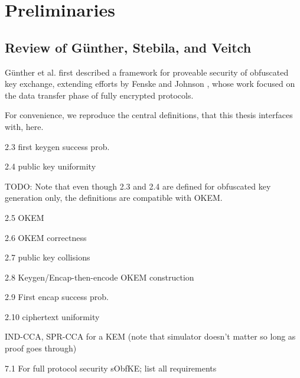 \chapter{Preliminaries}\label{ch:preliminaries}

\section{\texorpdfstring{Review of Günther, Stebila, and Veitch \cite{CCS:GunSteVei24}}{Review of Günther, Stebila, and Veitch}} \label{sec:review-gsv24}

Günther et al. first described a framework for proveable security of obfuscated key exchange, extending efforts by Fenske and Johnson \cite{CCS:FenJoh24}, whose work focused on the data transfer phase of fully encrypted protocols.

For convenience, we reproduce the central definitions, that this thesis interfaces with, here.

\begin{definition}\label{def:first-keygen-success}
    2.3 first keygen success prob.
\end{definition}

\begin{definition}\label{def:pk-uniformity}
    2.4 public key uniformity
\end{definition}

TODO: Note that even though 2.3 and 2.4 are defined for obfuscated key generation only, the definitions are compatible with OKEM.

\begin{definition}\label{def:okem}
    2.5 OKEM
\end{definition}

\begin{definition}\label{def:okem-correctness}
    2.6 OKEM correctness
\end{definition}

\begin{definition}\label{def:pk-collisions}
    2.7 public key collisions
\end{definition}

\begin{definition}\label{def:keygen-encap-then-encode}
    2.8 Keygen/Encap-then-encode OKEM construction
\end{definition}

\begin{definition}\label{def:first-encap-success}
    2.9 First encap success prob.
\end{definition}

\begin{definition}\label{def:ctxt-uniformity}
    2.10 ciphertext uniformity
\end{definition}

\begin{definition}\label{def:ind-spr-cca}
    IND-CCA, SPR-CCA for a KEM (note that simulator doesn't matter so long as proof goes through)
\end{definition}

\begin{theorem}\label{thm:s-obfuscated-keyex-security}
    7.1 For full protocol security sObfKE; list all requirements
\end{theorem}